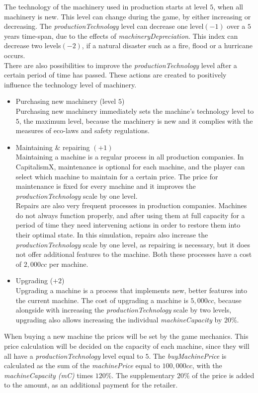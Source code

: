 The technology of the machinery used in production starts at level $5$, when all machinery is new. This level can change during the game, by either increasing or decreasing. The \textit{productionTechnology} level can decrease one level$(-1)$ over a $5$ years time-span, due to the effects of \textit{machineryDepreciation}. This index can decrease two levels$(-2)$, if a natural disaster such as a fire, flood or a hurricane occurs.\\
There are also possibilities to improve the \textit{productionTechnology} level after a certain period of time has passed. These actions are created to  positively influence the technology level of machinery.
\begin{itemize}
    \item Purchasing new machinery (level $5$) \\
Purchasing new machinery immediately sets the machine's technology level to $5$, the maximum level, because the machinery is new and it complies with the measures of eco-laws and safety regulations.
\item Maintaining \& repairing $(+1)$ \\
Maintaining a machine is a regular process in all production companies. In CapitalismX, maintenance is optional for each machine, and the player can select which machine to maintain for a certain price. The price for maintenance is fixed for every machine and it improves the \textit{productionTechnology} scale by one level. \\
Repairs are also very frequent processes in production companies. Machines do not always function properly, and after using them at full capacity for a period of time they need intervening actions in order to restore them into their optimal state. In this simulation, repairs also increase the \textit{productionTechnology} scale by one level, as repairing is necessary, but it does not offer additional features to the machine. Both these processes have a cost of $2,000cc$ per machine.

\item Upgrading ($+2$) \\
Upgrading a machine is a process that implements new, better features into the current machine.
The cost of upgrading a machine is $5,000cc$, because alongside with increasing the \textit{productionTechnology} scale by two levels, upgrading also allows increasing the individual \textit{machineCapacity} by $20\%$. 
\end{itemize}
When buying a new machine the prices will be set by the game mechanics. This price calculation will be decided on the capacity of each machine, since they will all have a \textit{productionTechnology} level equal to $5$. The \textit{buyMachinePrice} is calculated as the sum of the \textit{machinePrice} equal to $100,000cc$, with the \textit{machineCapacity (\gls{mC})} times $120\%$.  The supplementary $20\%$ of the price is added to the amount, as an additional payment for the retailer.
